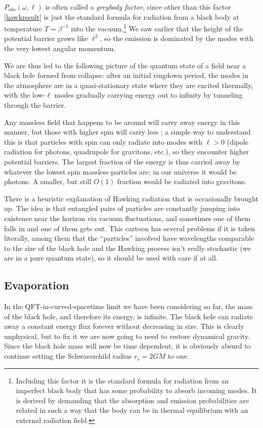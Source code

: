 \documentclass[12pt]{article}
\begin{document}
$P_{\mathit{abs}}(\omega,\ell)$ is often called a \textit{greybody factor}, since other than this factor \eqref{hawkresult} is just the standard formula for radiation from a black body at temperature $T=\beta^{-1}$ into the vacuum.\footnote{Including this factor it is the standard formula for radiation from an imperfect black body that has some probability to absorb incoming modes.  It is derived by demanding that the absorption and emission probabilities are related in such a way that the body can be in thermal equilibrium with an external radiation field.}  We saw earlier that the height of the potential barrier grows like $\ell^2$, so the emission is dominated by the modes with the very lowest angular momentum.    

We are thus led to the following picture of the quantum state of a field near a black hole formed from collapse: after an initial ringdown period, the modes in the atmosphere are in a quasi-stationary state where they are excited thermally, with the low-$\ell$ modes gradually carrying energy out to infinity by tunneling through the barrier.  

Any massless field that happens to be around will carry away energy in this manner, but those with higher spin will carry less \cite{Page:1976df}; a simple way to understand this is that particles with spin can only radiate into modes with $\ell>0$ (dipole radiation for photons, quadrupole for gravitons, etc.), so they encounter higher potential barriers.  The largest fraction of the energy is thus carried away by whatever the lowest spin massless particles are; in our universe it would be photons.  A smaller, but still $O(1)$ fraction would be radiated into gravitons.    

There is a heuristic explanation of Hawking radiation that is occasionally brought up.  The idea is that entangled pairs of particles are constantly jumping into existence near the horizon via vacuum fluctuations, and sometimes one of them falls in and one of them gets out.  This cartoon has several problems if it is taken literally, among them that the ``particles'' involved have wavelengths comparable to the size of the black hole and the Hawking process isn't really stochastic (we are in a pure quantum state), so it should be used with care if at all.  

\subsection{Evaporation}\label{tevap}
In the QFT-in-curved-spacetime limit we have been considering so far, the mass of the black hole, and therefore its energy, is infinite.  The black hole can radiate away a constant energy flux forever without decreasing in size.  This is clearly unphysical, but to fix it we are now going to need to restore dynamical gravity.  Since the black hole mass will now be time dependent, it is obviously absurd to continue setting the Schwarszchild radius $r_s=2GM$ to one.  
\end{document}
